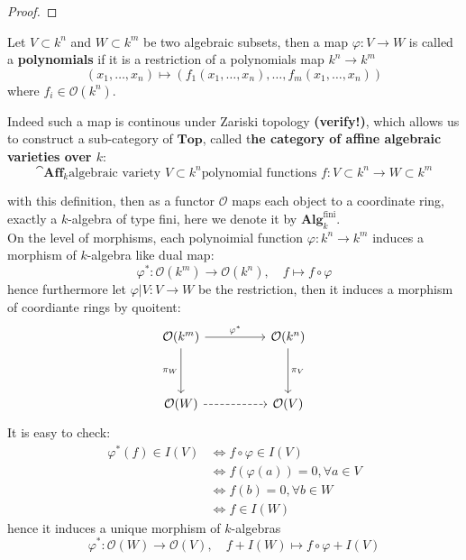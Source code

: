 \begin{proof}
    
\end{proof}

\begin{definition}
    Let \(V \subset k^n\) and \(W \subset k^m\) be two algebraic subsets, then a map \(\varphi: V \to W\) is called a \textbf{polynomials} if it is a restriction of a polynomials map \(k^n \to k^m\)
    \[(x_1,\dots,x_n) \mapsto (f_1(x_1,\dots,x_n),\dots,f_m(x_1,\dots,x_n))\]
    where \(f_i \in \mathcal{O}(k^n)\).
\end{definition}

Indeed such a map is continous under Zariski topology \textbf{(verify!)}, which allows us to construct a sub-category of \(\mathbf{Top}\), called t\textbf{he category of affine algebraic varieties over \(k\)}:
\[\cat{\mathbf{Aff}_k}{\text{algebraic variety } V \subset k^n}{\text{polynomial functions } f: V\subset k^n \to W \subset k^m}\]

with this definition, then as a functor \(\mathcal{O}\) maps each object to a coordinate ring, exactly a \(k\)-algebra of type fini, here we denote it by \(\mathbf{Alg}_k^{\text{fini}}\).\\

On the level of morphisms, each polynoimial function \(\varphi:k^n \to k^m\) induces a morphism of \(k\)-algebra like dual map:
\[\varphi^*: \mathcal{O}(k^m) \to \mathcal{O}(k^n), \quad f \mapsto f\circ \varphi \]
hence furthermore let \(\varphi|V:V \to W\) be the restriction, then it induces a morphism of coordiante rings by quoitent:
\[\begin{tikzcd}
	{\mathcal{O}(k^m)} && {\mathcal{O}(k^n)} \\
	\\
	{\mathcal{O}(W)} && {\mathcal{O}(V)}
	\arrow["{\varphi^*}", from=1-1, to=1-3]
	\arrow["{\pi_W}"', from=1-1, to=3-1]
	\arrow["{\pi_V}", from=1-3, to=3-3]
	\arrow[dashed, from=3-1, to=3-3]
\end{tikzcd}\]
It is easy to check:
\begin{align*}
    \varphi^*(f) \in I(V) &\iff f \circ \varphi \in I(V) \\
    &\iff f(\varphi(a)) = 0, \forall a \in V\\
    &\iff f(b) = 0, \forall b \in W \quad\\
    &\iff f \in I(W)
\end{align*}
hence it induces a unique morphism of \(k\)-algebras
\[\varphi^*: \mathcal{O}(W) \to \mathcal{O}(V), \quad f+I(W) \mapsto f \circ \varphi + I(V)\]

